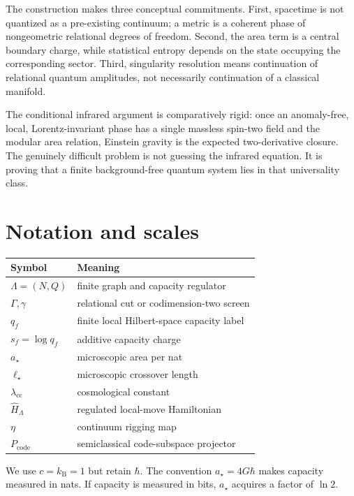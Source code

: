 \documentclass[11pt]{article}
\theoremstyle{remark}
\begin{document}
The construction makes three conceptual commitments.  First, spacetime
is not quantized as a pre-existing continuum; a metric is a coherent
phase of nongeometric relational degrees of freedom.  Second, the area
term is a central boundary charge, while statistical entropy depends on
the state occupying the corresponding sector.  Third, singularity
resolution means continuation of relational quantum amplitudes, not
necessarily continuation of a classical manifold.

The conditional infrared argument is comparatively rigid: once an
anomaly-free, local, Lorentz-invariant phase has a single massless
spin-two field and the modular area relation, Einstein gravity is the
expected two-derivative closure.  The genuinely difficult problem is not
guessing the infrared equation.  It is proving that a finite
background-free quantum system lies in that universality class.

\appendix

\section{Notation and scales}

\begin{center}
\begin{tabular}{ll}
\toprule
Symbol & Meaning\\
\midrule
\(\Lambda=(N,Q)\) & finite graph and capacity regulator\\
\(\Gamma,\gamma\) & relational cut or codimension-two screen\\
\(q_f\) & finite local Hilbert-space capacity label\\
\(s_f=\log q_f\) & additive capacity charge\\
\(a_\star\) & microscopic area per nat\\
\(\ell_\star\) & microscopic crossover length\\
\(\lambda_{\mathrm{cc}}\) & cosmological constant\\
\(\widehat H_\Lambda\) & regulated local-move Hamiltonian\\
\(\eta\) & continuum rigging map\\
\(P_{\mathrm{code}}\) & semiclassical code-subspace projector\\
\bottomrule
\end{tabular}
\end{center}

We use \(c=k_{\mathrm B}=1\) but retain \(\hbar\).  The convention
\(a_\star=4G\hbar\) makes capacity measured in nats.  If capacity is
measured in bits, \(a_\star\) acquires a factor of \(\ln 2\).
\end{document}
